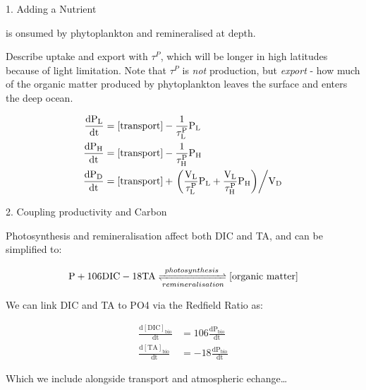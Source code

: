 \begin{frame}{1. Adding a Nutrient}

     is onsumed by phytoplankton and remineralised at depth. 
    
    Describe uptake and export with $\tau^P$, which will be longer in high latitudes because of light limitation. Note that $\tau^P$ is \textit{not} production, but \textit{export} - how much of the organic matter produced by phytoplankton leaves the surface and enters the deep ocean.

    \begin{align*}
        \mathrm{\frac{\mathrm{d}P_L}{\mathrm{d}t}} &= \mathrm{[\mathrm{transport}] - \frac{1}{\tau^P_L} P_L} \\
        \mathrm{\frac{\mathrm{d}P_H}{\mathrm{d}t}} &= \mathrm{[\mathrm{transport}] - \frac{1}{\tau^P_H} P_H} \\
        \mathrm{\frac{\mathrm{d}P_D}{\mathrm{d}t}} &= \mathrm{[\mathrm{transport}] + \left. \left( \frac{V_L}{\tau^P_L} P_L + \frac{V_L}{\tau^P_H} P_H \right) \middle/ V_D \right.}
    \end{align*}

\end{frame}

\begin{frame}{2. Coupling productivity and Carbon}

    Photosynthesis and remineralisation affect both DIC and TA, and can be simplified to:

    $$
    \mathrm{P + 106 DIC - 18 TA \xrightleftharpoons[remineralisation]{photosynthesis} [organic~matter]}
    $$

    We can link DIC and TA to PO4 via the Redfield Ratio as:

    \begin{align*}
        \mathrm{\frac{d[DIC]_{bio}}{dt}} &= \mathrm{106 \frac{dP_{bio}}{dt}} \\
        \mathrm{\frac{d[TA]_{bio}}{dt}} &= \mathrm{-18 \frac{dP_{bio}}{dt}}
    \end{align*}

    Which we include alongside transport and atmospheric echange\dots

\end{frame}

